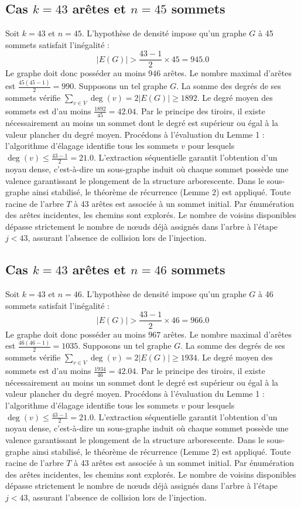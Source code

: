 \documentclass[12pt,a4paper]{article}
\begin{document}
\subsection{Cas $k = 43$ arêtes et $n = 45$ sommets}
Soit $k = 43$ et $n = 45$. L'hypothèse de densité impose qu'un graphe $G$ à 45 sommets satisfait l'inégalité :
$$ |E(G)| > \frac{43-1}{2} \times 45 = 945.0 $$
Le graphe doit donc posséder au moins $946$ arêtes. Le nombre maximal d'arêtes est $\frac{45(45-1)}{2} = 990$.
Supposons un tel graphe $G$. La somme des degrés de ses sommets vérifie $\sum_{v \in V} \deg(v) = 2|E(G)| \geq 1892$.
Le degré moyen des sommets est d'au moins $\frac{1892}{45} = 42.04$.
Par le principe des tiroirs, il existe nécessairement au moins un sommet dont le degré est supérieur ou égal à la valeur plancher du degré moyen.
Procédons à l'évaluation du Lemme 1 : l'algorithme d'élagage identifie tous les sommets $v$ pour lesquels $\deg(v) \leq \frac{43-1}{2} = 21.0$.
L'extraction séquentielle garantit l'obtention d'un noyau dense, c'est-à-dire un sous-graphe induit où chaque sommet possède une valence garantissant le plongement de la structure arborescente.
Dans le sous-graphe ainsi stabilisé, le théorème de récurrence (Lemme 2) est appliqué. Toute racine de l'arbre $T$ à 43 arêtes est associée à un sommet initial. Par énumération des arêtes incidentes, les chemins sont explorés. Le nombre de voisins disponibles dépasse strictement le nombre de nœuds déjà assignés dans l'arbre à l'étape $j < 43$, assurant l'absence de collision lors de l'injection.

\subsection{Cas $k = 43$ arêtes et $n = 46$ sommets}
Soit $k = 43$ et $n = 46$. L'hypothèse de densité impose qu'un graphe $G$ à 46 sommets satisfait l'inégalité :
$$ |E(G)| > \frac{43-1}{2} \times 46 = 966.0 $$
Le graphe doit donc posséder au moins $967$ arêtes. Le nombre maximal d'arêtes est $\frac{46(46-1)}{2} = 1035$.
Supposons un tel graphe $G$. La somme des degrés de ses sommets vérifie $\sum_{v \in V} \deg(v) = 2|E(G)| \geq 1934$.
Le degré moyen des sommets est d'au moins $\frac{1934}{46} = 42.04$.
Par le principe des tiroirs, il existe nécessairement au moins un sommet dont le degré est supérieur ou égal à la valeur plancher du degré moyen.
Procédons à l'évaluation du Lemme 1 : l'algorithme d'élagage identifie tous les sommets $v$ pour lesquels $\deg(v) \leq \frac{43-1}{2} = 21.0$.
L'extraction séquentielle garantit l'obtention d'un noyau dense, c'est-à-dire un sous-graphe induit où chaque sommet possède une valence garantissant le plongement de la structure arborescente.
Dans le sous-graphe ainsi stabilisé, le théorème de récurrence (Lemme 2) est appliqué. Toute racine de l'arbre $T$ à 43 arêtes est associée à un sommet initial. Par énumération des arêtes incidentes, les chemins sont explorés. Le nombre de voisins disponibles dépasse strictement le nombre de nœuds déjà assignés dans l'arbre à l'étape $j < 43$, assurant l'absence de collision lors de l'injection.
\end{document}
